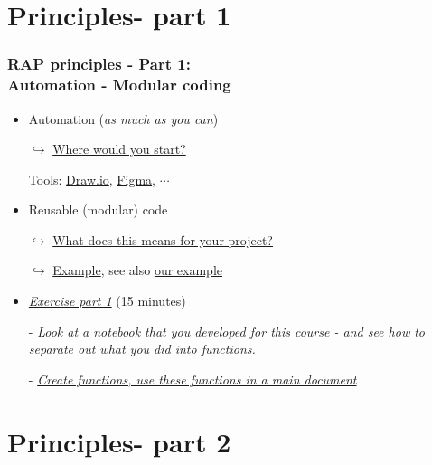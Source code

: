 \documentclass[xcolor=x11names,compress]{beamer}
\renewcommand{\(}{\begin{columns}}
\renewcommand{\)}{\end{columns}}
\newcommand{\<}[1]{\begin{column}{#1}}
\renewcommand{\>}{\end{column}}
\begin{document}
\section{Principles- part 1}

\begin{frame}[<+->]
   \frametitle{RAP principles - Part 1:\\  Automation - Modular coding}
   \pause
    \begin{itemize}[<+->]
     \item Automation (\emph{as much as you can})
     \item[$\hookrightarrow$]\href{https://sergegoussev.github.io/ESCAP_RAP_class/docs/applying_rap/process-mapping.html\#overview-of-the-ads-processing-view}{Where would you start? }
     \item[Tools:]\href{https://app.diagrams.net/}{Draw.io}, \href{https://www.figma.com/design/}{Figma}, $\cdots$
     \item Reusable (modular) code
     \item[$\hookrightarrow$]\href{https://sergegoussev.github.io/ESCAP_RAP_class/docs/teaching_materials/sept_18/sept_18_session.html\#principle-2-modular-re-usableBuild blocs}{What does this means for your project?}
     \item[$\hookrightarrow$]\href{https://sergegoussev.github.io/ESCAP_RAP_class/docs/teaching_materials/sept_18/sept_18_session.html\#what-does-this-mean-if-we-put-it-together}{Example},  see also \href{https://sergegoussev.github.io/ESCAP_RAP_class/docs/applying_rap/}{our example}
     \item \href{https://sergegoussev.github.io/ESCAP_RAP_class/docs/teaching_materials/sept_18/sept_18_session.html\#excercize-1}{\emph{Exercise part 1}} (15 minutes)
     \item[-] \emph{Look at a notebook that you developed for this course - and see how to separate out what you did into functions.}
     \item[-] \href{https://nhsdigital.github.io/rap-community-of-practice/training_resources/python/python-functions/\#coding-challenge}{\emph{Create functions, use these functions in a main document}}
    \end{itemize}
\end{frame}


\section{Principles- part 2}
\end{document}
